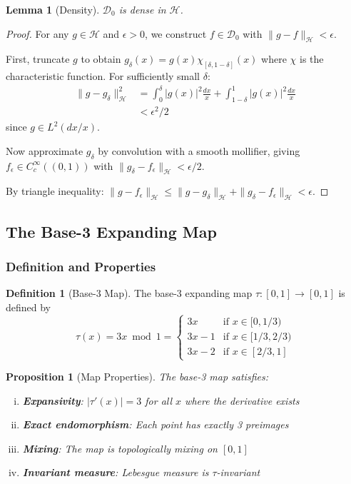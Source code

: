 \documentclass[12pt,letterpaper]{article}
\theoremstyle{plain}
\newtheorem{lemma}[theorem]{Lemma}
\newtheorem{proposition}[theorem]{Proposition}
\theoremstyle{definition}
\newtheorem{definition}[theorem]{Definition}
\theoremstyle{remark}
\newcommand{\norm}[1]{\|#1\|}
\newcommand{\hilbert}{\mathcal{H}}
\begin{document}
\begin{lemma}[Density]\label{lem:density}
$\mathcal{D}_0$ is dense in $\hilbert$.
\end{lemma}

\begin{proof}
For any $g \in \hilbert$ and $\epsilon > 0$, we construct $f \in \mathcal{D}_0$ with $\norm{g - f}_{\hilbert} < \epsilon$.

First, truncate $g$ to obtain $g_{\delta}(x) = g(x)\chi_{[\delta, 1-\delta]}(x)$ where $\chi$ is the characteristic function. For sufficiently small $\delta$:
\begin{align}
\norm{g - g_{\delta}}_{\hilbert}^2 &= \int_0^{\delta} |g(x)|^2 \frac{dx}{x} + \int_{1-\delta}^1 |g(x)|^2 \frac{dx}{x}\\
&< \epsilon^2/2
\end{align}
since $g \in L^2(dx/x)$.

Now approximate $g_{\delta}$ by convolution with a smooth mollifier, giving $f_{\epsilon} \in C_c^{\infty}((0,1))$ with $\norm{g_{\delta} - f_{\epsilon}}_{\hilbert} < \epsilon/2$.

By triangle inequality: $\norm{g - f_{\epsilon}}_{\hilbert} \leq \norm{g - g_{\delta}}_{\hilbert} + \norm{g_{\delta} - f_{\epsilon}}_{\hilbert} < \epsilon$.
\end{proof}

\subsection{The Base-3 Expanding Map}

\subsubsection{Definition and Properties}

\begin{definition}[Base-3 Map]\label{def:base3_map}
The base-3 expanding map $\tau: [0,1] \to [0,1]$ is defined by
\begin{equation}\label{eq:base3_map}
\tau(x) = 3x \bmod 1 = \begin{cases}
3x & \text{if } x \in [0, 1/3) \\
3x - 1 & \text{if } x \in [1/3, 2/3) \\
3x - 2 & \text{if } x \in [2/3, 1]
\end{cases}
\end{equation}
\end{definition}

\begin{proposition}[Map Properties]\label{prop:map_props}
The base-3 map satisfies:
\begin{enumerate}[(i)]
\item \textbf{Expansivity}: $|\tau'(x)| = 3$ for all $x$ where the derivative exists
\item \textbf{Exact endomorphism}: Each point has exactly 3 preimages
\item \textbf{Mixing}: The map is topologically mixing on $[0,1]$
\item \textbf{Invariant measure}: Lebesgue measure is $\tau$-invariant
\end{enumerate}
\end{proposition}
\end{document}
